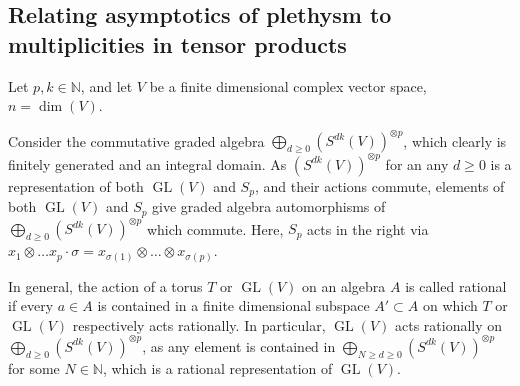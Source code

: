 \documentclass[a4paper]{amsart}
\def\N{{\mathbb{N}}}
\DeclareMathOperator{\GL}{\mathrm{GL}}
\begin{document}
\subsection{Relating asymptotics of plethysm to multiplicities in tensor products}
Let $p,k\in\N$, and let $V$ be a finite dimensional complex vector space, $n=\dim(V)$.

Consider the commutative graded algebra $\bigoplus_{d\geq 0}(S^{dk}(V))^{\otimes p}$, which clearly is finitely generated and an integral domain.
As $(S^{dk}(V))^{\otimes p}$ for an any $d\geq0$ is a representation of both $\GL(V)$ and $S_p$, and their actions commute,
elements of both $\GL(V)$ and $S_p$ give graded algebra automorphisms of $\bigoplus_{d\geq0}(S^{dk}(V))^{\otimes p}$ which commute.
Here, $S_p$ acts in the right via $x_1\otimes\ldots x_p\cdot\sigma=x_{\sigma(1)}\otimes\ldots\otimes x_{\sigma(p)}$.

In general, the action of a torus $T$ or $\GL(V)$ on an algebra $A$ is called rational if every $a\in A$ is contained in a finite dimensional subspace $A'\subset A$ on which $T$ or $\GL(V)$ respectively acts rationally.
In particular, $\GL(V)$ acts rationally on $\bigoplus_{d\geq0}(S^{dk}(V))^{\otimes p}$,
as any element is contained in $\bigoplus_{N\geq d\geq0}(S^{dk}(V))^{\otimes p}$ for some $N\in\N$, which is a rational representation of $\GL(V)$.
\end{document}
